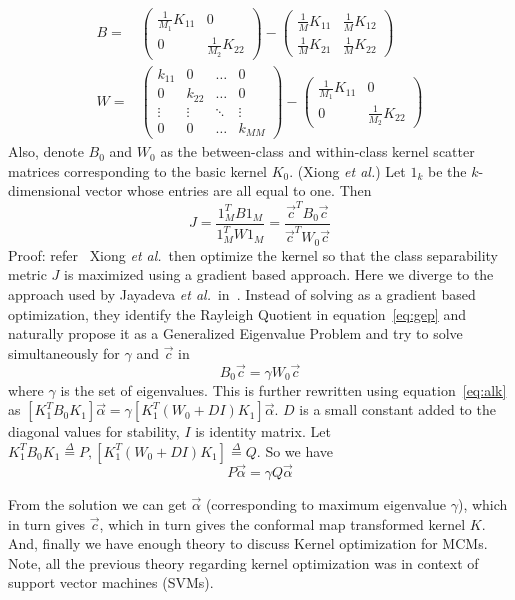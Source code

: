 \documentclass[11pt]{article}
\newcommand{\etal}{{\em et al.}}
\begin{document}
\begin{align}
    \label{eq:B}B=&\begin{pmatrix}
        \frac{1}{M_1}K_{11}&0\\
        0&\frac{1}{M_2}K_{22}
        \end{pmatrix}-\begin{pmatrix}
            \frac{1}{M}K_{11}&\frac{1}{M}K_{12}\\
            \frac{1}{M}K_{21}&\frac{1}{M}K_{22}
    \end{pmatrix}\\
    \label{eq:W}W=&\begin{pmatrix}
        k_{11} & 0 & \dots & 0\\
        0 & k_{22} & \dots & 0\\
        \vdots & \vdots & \ddots & \vdots\\
        0 & 0 & \dots & k_{MM}
        \end{pmatrix}-\begin{pmatrix}\frac{1}{M_1}K_{11}&0\\0&\frac{1}{M_2}K_{22}\end{pmatrix}
\end{align}
Also, denote $B_0$ and $W_0$ as the between-class and within-class kernel
scatter matrices corresponding to the basic kernel $K_0$.
{\theorem (Xiong \etal) Let $1_k$ be the $k$-dimensional vector whose
entries are all equal to one. Then
\begin{equation}
    \label{eq:gep}
    J=\frac{1_M^TB1_M}{1_M^TW1_M}=\frac{\vec{c}^TB_0\vec{c}}{\vec{c}^TW_0\vec{c}}
\end{equation}
Proof: refer~\cite{xiong}
}
Xiong \etal\ then optimize the kernel so that the class separability metric $J$
is maximized using a gradient based approach. Here we diverge to the approach
used by Jayadeva \etal\ in~\cite{keropt}. Instead of solving as a gradient based
optimization, they identify the Rayleigh Quotient in equation~\ref{eq:gep} and
naturally propose it as a Generalized Eigenvalue Problem and try to solve
simultaneously for $\gamma$ and $\vec{c}$ in
\[B_0\vec{c}=\gamma W_0\vec{c}
\]
where $\gamma$ is the set of eigenvalues. This is further rewritten using
equation~\ref{eq:alk} as $[K_1^TB_0K_1]\vec{\alpha}=\gamma[K_1^T(W_0+DI)K_1]\vec{\alpha}$.
$D$ is a small constant added to the diagonal values for stability, $I$ is
identity matrix. Let $K_1^TB_0K_1\stackrel{\Delta}{=}P,
[K_1^T(W_0+DI)K_1]\stackrel{\Delta}{=}Q$. So we have 
\begin{equation}
    \label{eq:GEP}P\vec{\alpha}=\gamma Q\vec{\alpha}
\end{equation}\par
From the solution we can get $\vec{\alpha}$ (corresponding to maximum eigenvalue
$\gamma$), which in turn gives $\vec{c}$, which in turn gives the conformal
map transformed kernel $K$. And, finally we have enough theory to discuss Kernel
optimization for MCMs. Note, all the previous theory regarding kernel
optimization was in context of support vector machines (SVMs).
\end{document}
